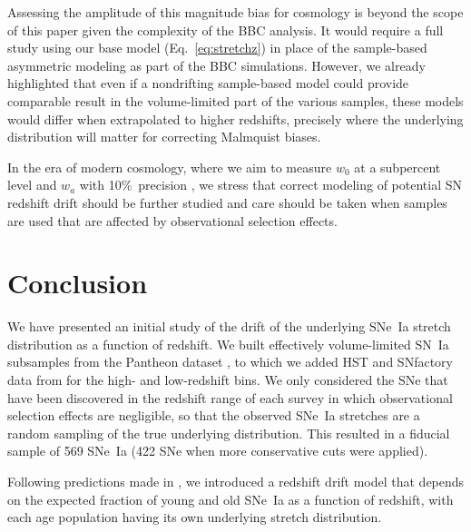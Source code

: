 \documentclass[]{aa}
\begin{document}
Assessing the amplitude of this magnitude bias for cosmology is beyond
the scope of this paper given the complexity of the BBC analysis. It would
require a full study using our base model (Eq.~\ref{eq:stretchz}) in place of
the sample-based asymmetric modeling as part of the BBC simulations. However, we
already highlighted that even if a nondrifting sample-based model could provide
comparable result in the volume-limited part of the various samples, these
models would differ when extrapolated to higher redshifts, precisely where the
underlying distribution will matter for correcting Malmquist biases.

In the era of modern cosmology, where we aim to measure $w_0$ at a
subpercent level and $w_a$ with 10\%\ precision
\citep[e.g.,][]{lsstpaper}, we stress that correct modeling of potential SN
redshift drift should be further studied and care should be taken when
samples are used that are affected by observational selection effects.

\section{Conclusion}\label{sec:ccl}

We have presented an initial study of the drift of the underlying
SNe~Ia stretch distribution as a function of redshift. We built
effectively volume-limited SN~Ia subsamples from the Pantheon dataset
\citep[][SDSS, PS1, and SNLS]{scolnic2018a}, to which we added HST and SNfactory
data from \cite{rigault2020} for the high- and low-redshift bins. We only
considered the SNe that have been discovered in the redshift range of each
survey in which observational selection effects are negligible, so that
the observed SNe~Ia stretches are a random sampling of the true underlying
distribution. This resulted in a fiducial sample of 569 SNe~Ia (422 SNe
when more conservative cuts were applied).

Following predictions made in \cite{rigault2020}, we introduced a redshift drift
model that depends on the expected fraction of young and old SNe~Ia as
a function of redshift, with each age population having its own
underlying stretch distribution.
\end{document}
